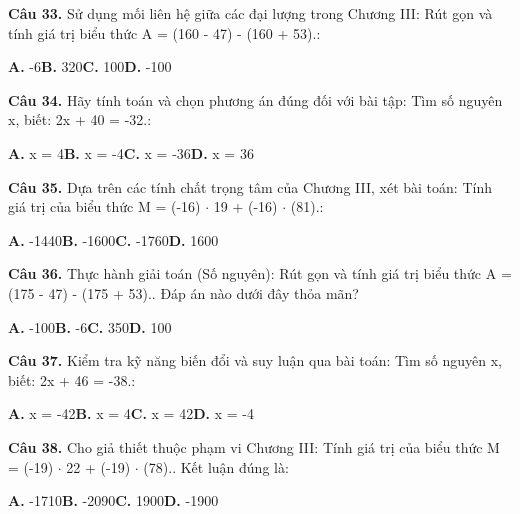 \documentclass[11pt,a4paper]{article}
\begin{document}
\textbf{\color{primary} Câu 33.} Sử dụng mối liên hệ giữa các đại lượng trong Chương III: Rút gọn và tính giá trị biểu thức A = (160 - 47) - (160 + 53).:\par
\hspace*{1.5em}\textbf{A.} -6\quad\quad \textbf{B.} 320\quad\quad \textbf{C.} 100\quad\quad \textbf{D.} -100\par\vspace{2pt}
\textbf{\color{primary} Câu 34.} Hãy tính toán và chọn phương án đúng đối với bài tập: Tìm số nguyên x, biết: 2x + 40 = -32.:\par
\hspace*{1.5em}\textbf{A.} x = 4\quad\quad \textbf{B.} x = -4\quad\quad \textbf{C.} x = -36\quad\quad \textbf{D.} x = 36\par\vspace{2pt}
\textbf{\color{primary} Câu 35.} Dựa trên các tính chất trọng tâm của Chương III, xét bài toán: Tính giá trị của biểu thức M = (-16) $\cdot$ 19 + (-16) $\cdot$ (81).:\par
\hspace*{1.5em}\textbf{A.} -1440\quad\quad \textbf{B.} -1600\quad\quad \textbf{C.} -1760\quad\quad \textbf{D.} 1600\par\vspace{2pt}
\textbf{\color{primary} Câu 36.} Thực hành giải toán (Số nguyên): Rút gọn và tính giá trị biểu thức A = (175 - 47) - (175 + 53).. Đáp án nào dưới đây thỏa mãn?\par
\hspace*{1.5em}\textbf{A.} -100\quad\quad \textbf{B.} -6\quad\quad \textbf{C.} 350\quad\quad \textbf{D.} 100\par\vspace{2pt}
\textbf{\color{primary} Câu 37.} Kiểm tra kỹ năng biến đổi và suy luận qua bài toán: Tìm số nguyên x, biết: 2x + 46 = -38.:\par
\hspace*{1.5em}\textbf{A.} x = -42\quad\quad \textbf{B.} x = 4\quad\quad \textbf{C.} x = 42\quad\quad \textbf{D.} x = -4\par\vspace{2pt}
\textbf{\color{primary} Câu 38.} Cho giả thiết thuộc phạm vi Chương III: Tính giá trị của biểu thức M = (-19) $\cdot$ 22 + (-19) $\cdot$ (78).. Kết luận đúng là:\par
\hspace*{1.5em}\textbf{A.} -1710\quad\quad \textbf{B.} -2090\quad\quad \textbf{C.} 1900\quad\quad \textbf{D.} -1900\par\vspace{2pt}
\end{document}
